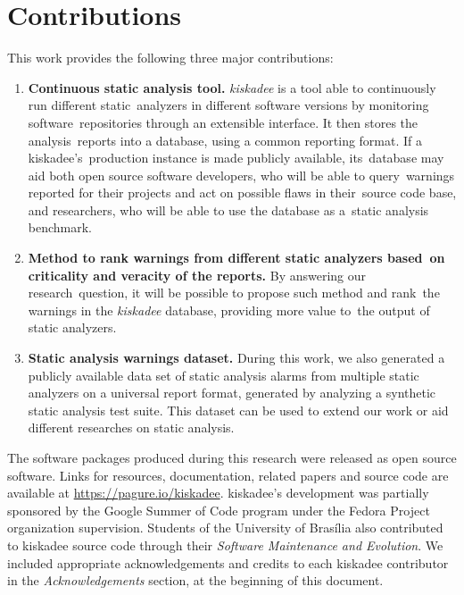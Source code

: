 \section{Contributions}
\label{sec:contributions}

This work provides the following three major contributions:

\begin{enumerate}[label=C\arabic*]
  \item \textbf{Continuous static analysis tool.}
    \textit{kiskadee} is a tool able to continuously run different static\
    analyzers in different software versions by monitoring software\
    repositories through an extensible interface. It then stores the analysis\
    reports into a database, using a common reporting format. If a kiskadee's\
    production instance is made publicly available, its\
    database may aid both open source software developers, who will be able to query\
    warnings reported for their projects and act on possible flaws in their\
    source code base, and researchers, who will be able to use the database as a\
    static analysis benchmark.

  \item \textbf{Method to rank warnings from different static analyzers based\
    on criticality and veracity of the reports.} By answering our research\
    question, it will be possible to propose such method and rank\
    the warnings in the \textit{kiskadee} database, providing more value to\
    the output of static analyzers.

  \item \textbf{Static analysis warnings dataset.} During this work, we also
    generated a publicly available data set of static analysis alarms from
    multiple static analyzers on a universal report format, generated by
    analyzing a synthetic static analysis test suite. This dataset can be used
    to extend our work or aid different researches on static analysis.

\end{enumerate}

The software packages produced during this research were released as open
source software. Links for resources, documentation, related papers and source
code are available at \url{https://pagure.io/kiskadee}. kiskadee's development
was partially sponsored by the Google Summer of Code program under the Fedora
Project organization supervision. Students of the University of Brasília also
contributed to kiskadee source code through their \textit{Software Maintenance
and Evolution}. We included appropriate acknowledgements and credits to each
kiskadee contributor in the \emph{Acknowledgements} section, at the beginning of
this document.

